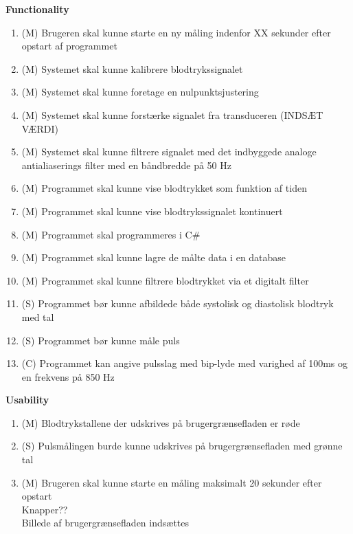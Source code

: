 \textbf{Functionality}\\
\begin{enumerate}
	\item (M) Brugeren skal kunne starte en ny måling indenfor XX sekunder efter opstart af programmet \\
	\item (M) Systemet skal kunne kalibrere blodtrykssignalet\\
	\item (M) Systemet skal kunne foretage en nulpunktsjustering\\
	\item (M) Systemet skal kunne forstærke signalet fra transduceren (INDSÆT VÆRDI)\\
	\item (M) Systemet skal kunne filtrere signalet med det indbyggede analoge antialiaserings filter med en båndbredde på 50 Hz \\
	\item (M) Programmet skal kunne vise blodtrykket som funktion af tiden\\
	\item (M) Programmet skal kunne vise blodtrykssignalet kontinuert\\
	\item (M) Programmet skal programmeres i C\#\\
	\item (M) Programmet skal kunne lagre de målte data i en database\\
	\item (M) Programmet skal kunne filtrere blodtrykket via et digitalt filter\\
	\item (S) Programmet bør kunne afbildede både systolisk og diastolisk blodtryk med tal\\
	\item (S) Programmet bør kunne måle puls\\
	\item (C) Programmet kan angive pulsslag med bip-lyde med varighed af 100ms og en frekvens på 850 Hz\\
\end{enumerate}

\textbf{Usability}\\
\begin{enumerate}
	\item (M) Blodtrykstallene der udskrives på brugergrænsefladen er røde\\
	\item (S) Pulsmålingen burde kunne udskrives på brugergrænsefladen med grønne tal\\
	\item (M) Brugeren skal kunne starte en måling maksimalt 20 sekunder efter opstart\\
Knapper??\\
Billede af brugergrænsefladen indsættes\\	
\end{enumerate}

